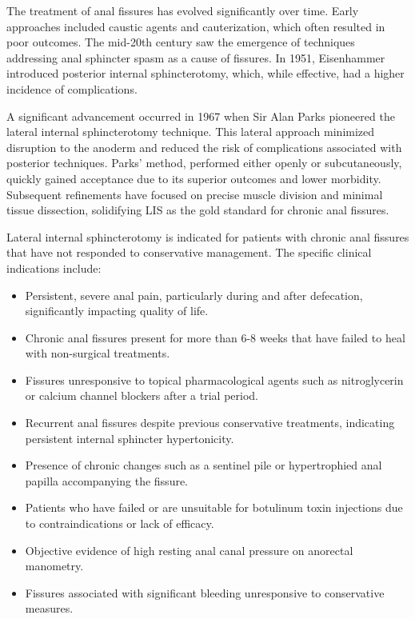 The treatment of anal fissures has evolved significantly over time. Early approaches included caustic agents and cauterization, which often resulted in poor outcomes. The mid-20th century saw the emergence of techniques addressing anal sphincter spasm as a cause of fissures. In 1951, Eisenhammer introduced posterior internal sphincterotomy, which, while effective, had a higher incidence of complications.

A significant advancement occurred in 1967 when Sir Alan Parks pioneered the lateral internal sphincterotomy technique. This lateral approach minimized disruption to the anoderm and reduced the risk of complications associated with posterior techniques. Parks' method, performed either openly or subcutaneously, quickly gained acceptance due to its superior outcomes and lower morbidity. Subsequent refinements have focused on precise muscle division and minimal tissue dissection, solidifying LIS as the gold standard for chronic anal fissures.

Lateral internal sphincterotomy is indicated for patients with chronic anal fissures that have not responded to conservative management. The specific clinical indications include:

\begin{itemize}
  \item Persistent, severe anal pain, particularly during and after defecation, significantly impacting quality of life.
  \item Chronic anal fissures present for more than 6-8 weeks that have failed to heal with non-surgical treatments.
  \item Fissures unresponsive to topical pharmacological agents such as nitroglycerin or calcium channel blockers after a trial period.
  \item Recurrent anal fissures despite previous conservative treatments, indicating persistent internal sphincter hypertonicity.
  \item Presence of chronic changes such as a sentinel pile or hypertrophied anal papilla accompanying the fissure.
  \item Patients who have failed or are unsuitable for botulinum toxin injections due to contraindications or lack of efficacy.
  \item Objective evidence of high resting anal canal pressure on anorectal manometry.
  \item Fissures associated with significant bleeding unresponsive to conservative measures.
\end{itemize}

